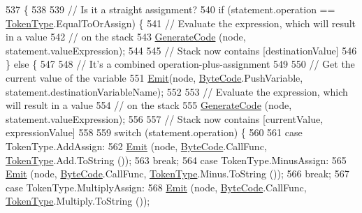 \begin{DoxyCode}
537                                                                            \{
538 
539             \textcolor{comment}{// Is it a straight assignment?}
540             \textcolor{keywordflow}{if} (statement.operation == \hyperlink{a00040_a301aa7c866593a5b625a8fc158bbeace}{TokenType}.EqualToOrAssign) \{
541                 \textcolor{comment}{// Evaluate the expression, which will result in a value}
542                 \textcolor{comment}{// on the stack}
543                 \hyperlink{a00043_a006f3becd521cc179ba3d3352f6f930b}{GenerateCode} (node, statement.valueExpression);
544 
545                 \textcolor{comment}{// Stack now contains [destinationValue]}
546             \} \textcolor{keywordflow}{else} \{
547 
548                 \textcolor{comment}{// It's a combined operation-plus-assignment}
549 
550                 \textcolor{comment}{// Get the current value of the variable}
551                 \hyperlink{a00043_a774e8c143cdda0584fcfdda98626a83c}{Emit}(node, \hyperlink{a00040_ad5dfb6ee68ca7469623ad3e459f98894}{ByteCode}.PushVariable, statement.destinationVariableName);
552 
553                 \textcolor{comment}{// Evaluate the expression, which will result in a value}
554                 \textcolor{comment}{// on the stack}
555                 \hyperlink{a00043_a006f3becd521cc179ba3d3352f6f930b}{GenerateCode} (node, statement.valueExpression);
556 
557                 \textcolor{comment}{// Stack now contains [currentValue, expressionValue]}
558 
559                 \textcolor{keywordflow}{switch} (statement.operation) \{
560 
561                 \textcolor{keywordflow}{case} TokenType.AddAssign:
562                     \hyperlink{a00043_a774e8c143cdda0584fcfdda98626a83c}{Emit} (node, \hyperlink{a00040_ad5dfb6ee68ca7469623ad3e459f98894}{ByteCode}.CallFunc, \hyperlink{a00040_a301aa7c866593a5b625a8fc158bbeace}{TokenType}.Add.ToString ());
563                     \textcolor{keywordflow}{break};
564                 \textcolor{keywordflow}{case} TokenType.MinusAssign:
565                     \hyperlink{a00043_a774e8c143cdda0584fcfdda98626a83c}{Emit} (node, \hyperlink{a00040_ad5dfb6ee68ca7469623ad3e459f98894}{ByteCode}.CallFunc, \hyperlink{a00040_a301aa7c866593a5b625a8fc158bbeace}{TokenType}.Minus.ToString ());
566                     \textcolor{keywordflow}{break};
567                 \textcolor{keywordflow}{case} TokenType.MultiplyAssign:
568                     \hyperlink{a00043_a774e8c143cdda0584fcfdda98626a83c}{Emit} (node, \hyperlink{a00040_ad5dfb6ee68ca7469623ad3e459f98894}{ByteCode}.CallFunc, \hyperlink{a00040_a301aa7c866593a5b625a8fc158bbeace}{TokenType}.Multiply.ToString ());

\end{DoxyCode}
